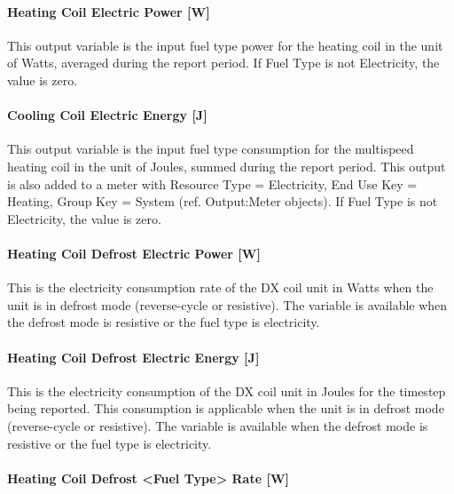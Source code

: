 \paragraph{Heating Coil Electric Power {[}W{]}}\label{heating-coil-electric-power-w-6}

This output variable is the input fuel type power for the heating coil in the unit of Watts, averaged during the report period. If Fuel Type is not Electricity, the value is zero.

\paragraph{Cooling Coil Electric Energy {[}J{]}}\label{cooling-coil-electric-energy-j-2}

This output variable is the input fuel type consumption for the multispeed heating coil in the unit of Joules, summed during the report period. This output is also added to a meter with Resource Type = Electricity, End Use Key = Heating, Group Key = System (ref. Output:Meter objects). If Fuel Type is not Electricity, the value is zero.

\paragraph{Heating Coil Defrost Electric Power {[}W{]}}\label{heating-coil-defrost-electric-power-w-1}

This is the electricity consumption rate of the DX coil unit in Watts when the unit is in defrost mode (reverse-cycle or resistive). The variable is available when the defrost mode is resistive or the fuel type is electricity.

\paragraph{Heating Coil Defrost Electric Energy {[}J{]}}\label{heating-coil-defrost-electric-energy-j-1}

This is the electricity consumption of the DX coil unit in Joules for the timestep being reported. This consumption is applicable when the unit is in defrost mode (reverse-cycle or resistive). The variable is available when the defrost mode is resistive or the fuel type is electricity.

\paragraph{Heating Coil Defrost \textless{}Fuel Type\textgreater{} Rate {[}W{]}}\label{heating-coil-defrost-fuel-type-rate-w}

